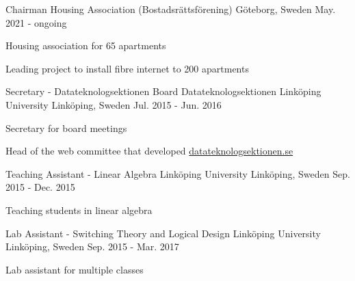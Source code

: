 

\begin{cventries}
  \cventry
    {Chairman} %
    {Housing Association (Bostadsrättsförening)} %
    {Göteborg, Sweden} %
    {May. 2021 - ongoing} %
    {
      \begin{cvitems} %
        \item {Housing association for 65 apartments}
        \item {Leading project to install fibre internet to 200 apartments}
      \end{cvitems}
    }

  \cventry
    {Secretary - Datateknologsektionen Board} %
    {Datateknologsektionen Linköping University} %
    {Linköping, Sweden} %
    {Jul. 2015 - Jun. 2016} %
    {
      \begin{cvitems} %
        \item {Secretary for board meetings}
        \item {Head of the web committee that developed \href{https://d-sektionen.se/}{datateknologsektionen.se}}
      \end{cvitems}
    }

  \cventry
  {Teaching Assistant - Linear Algebra} %
  {Linköping University} %
  {Linköping, Sweden} %
  {Sep. 2015 - Dec. 2015} %
  {
    \begin{cvitems} %
      \item {Teaching students in linear algebra}
    \end{cvitems}
  }


  \cventry
  {Lab Assistant - Switching Theory and Logical Design} %
  {Linköping University} %
  {Linköping, Sweden} %
  {Sep. 2015 - Mar. 2017} %
  {
    \begin{cvitems} %
      \item {Lab assistant for multiple classes}
    \end{cvitems}
  }


\end{cventries}
